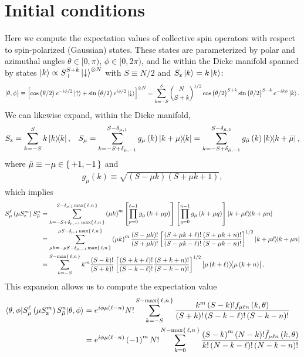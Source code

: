 \documentclass[pra,twocolumn,longbibliography]{revtex4-2}
\newcommand{\f}[2]{\dfrac{#1}{#2}} %
\newcommand{\p}[1]{\left( #1 \right)} %
\renewcommand{\sp}[1]{\left[ #1 \right]} %
\newcommand{\bk}{\braket} %
\newcommand{\z}{\text{z}}
\newcommand{\bmu}{{\bar\mu}}
\newcommand{\1}{\mathds{1}}
\newcommand{\up}{\uparrow}
\newcommand{\dn}{\downarrow}
\begin{document}
\section{Initial conditions}
\label{sec:initial_conditions}

Here we compute the expectation values of collective spin operators
with respect to spin-polarized (Gaussian) states.  These states are
parameterized by polar and azimuthal angles $\theta\in[0,\pi)$,
$\phi\in[0,2\pi)$, and lie within the Dicke manifold spanned by states
$\ket{k}\propto S_+^{S+k}\ket{\dn}^{\otimes N}$ with $S\equiv N/2$ and
$S_\z\ket{k}=k\ket{k}$:
\begin{align}
  \ket{\theta,\phi}
  \equiv \sp{\cos\p{\theta/2} e^{-i\phi/2} \ket\up
    + \sin\p{\theta/2} e^{i\phi/2} \ket\dn}^{\otimes N}
  = \sum_{k=-S}^S { N \choose S+k }^{1/2}
  \cos\p{\theta/2}^{S+k} \sin\p{\theta/2}^{S-k} e^{-ik\phi} \ket{k}.
\end{align}
We can likewise expand, within the Dicke manifold,
\begin{align}
  S_\z = \sum_{k=-S}^S k \op{k},
  &&
  S_\mu = \sum_{k=-S+\delta_{\mu,-1}}^{S-\delta_{\mu,1}}
  g_\mu\p{k} \op{k+\mu}{k}
  = \sum_{k=-S+\delta_{\bmu,-1}}^{S-\delta_{\bmu,1}}
  g_\bmu\p{k} \op{k}{k+\bmu},
\end{align}
where $\bmu\equiv-\mu\in\set{+1,-1}$ and
\begin{align}
  g_\mu\p{k} \equiv \sqrt{\p{S-\mu k}\p{S+\mu k+1}},
\end{align}
which implies
\begin{align}
  S_\mu^\ell \p{\mu S_\z^m} S_\bmu^n
  &= \sum_{k=-S+\delta_{\mu,-1}\max\set{\ell,n}}
  ^{S-\delta_{\mu,1}\max\set{\ell,n}} \p{\mu k}^m
  \sp{\prod_{p=0}^{\ell-1} g_\mu\p{k+\mu p}}
  \sp{\prod_{q=0}^{n-1} g_\mu\p{k+\mu q}}
  \op{k+\mu\ell}{k+\mu n} \\
  &= \sum_{\mu k=-\mu S-\delta_{\mu,-1}\max\set{\ell,n}}
  ^{\mu S-\delta_{\mu,1}\max\set{\ell,n}} \p{\mu k}^m
  \f{\p{S-\mu k}!}{\p{S+\mu k}!}
  \sp{\f{\p{S+\mu k+\ell}!}{\p{S-\mu k-\ell}!}
    \f{\p{S+\mu k+n}!}{\p{S-\mu k-n}!}}^{1/2}
  \op{k+\mu\ell}{k+\mu n} \\
  &= \sum_{k=-S}^{S-\max\set{\ell,n}} k^m
  \f{\p{S-k}!}{\p{S+k}!}
  \sp{\f{\p{S+k+\ell}!}{\p{S-k-\ell}!}
    \f{\p{S+k+n}!}{\p{S-k-n}!}}^{1/2}
  \op{\mu\p{k+\ell}}{\mu\p{k+n}}.
\end{align}
This expansion allows us to compute the expectation value
\begin{align}
  \bk{\theta,\phi|S_\mu^\ell \p{\mu S_\z^m} S_\bmu^n|\theta,\phi}
  &= e^{i\phi \mu\p{\ell-n}} N! \sum_{k=-S}^{S-\max\set{\ell,n}}
  \f{k^m \p{S-k}! f_{\mu\ell n}\p{k,\theta}}
  {\p{S+k}! \p{S-k-\ell}! \p{S-k-n}!} \\
  &= e^{i\phi \mu\p{\ell-n}} \p{-1}^m N! \sum_{k=0}^{N-\max\set{\ell,n}}
  \f{\p{S-k}^m \p{N-k}! \tilde f_{\mu\ell n}\p{k,\theta}}
  {k! \p{N-k-\ell}! \p{N-k-n}!}
\end{align}
\end{document}
